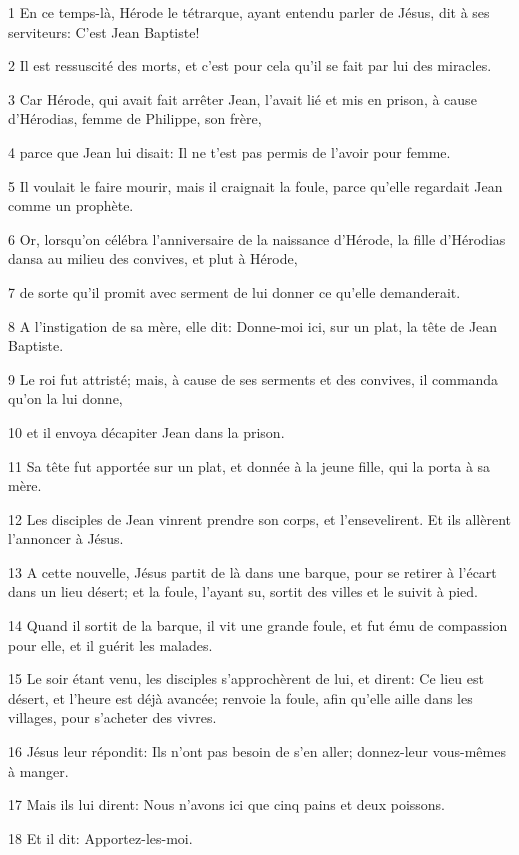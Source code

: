 \par 1 En ce temps-là, Hérode le tétrarque, ayant entendu parler de Jésus, dit à ses serviteurs: C'est Jean Baptiste!
\par 2 Il est ressuscité des morts, et c'est pour cela qu'il se fait par lui des miracles.
\par 3 Car Hérode, qui avait fait arrêter Jean, l'avait lié et mis en prison, à cause d'Hérodias, femme de Philippe, son frère,
\par 4 parce que Jean lui disait: Il ne t'est pas permis de l'avoir pour femme.
\par 5 Il voulait le faire mourir, mais il craignait la foule, parce qu'elle regardait Jean comme un prophète.
\par 6 Or, lorsqu'on célébra l'anniversaire de la naissance d'Hérode, la fille d'Hérodias dansa au milieu des convives, et plut à Hérode,
\par 7 de sorte qu'il promit avec serment de lui donner ce qu'elle demanderait.
\par 8 A l'instigation de sa mère, elle dit: Donne-moi ici, sur un plat, la tête de Jean Baptiste.
\par 9 Le roi fut attristé; mais, à cause de ses serments et des convives, il commanda qu'on la lui donne,
\par 10 et il envoya décapiter Jean dans la prison.
\par 11 Sa tête fut apportée sur un plat, et donnée à la jeune fille, qui la porta à sa mère.
\par 12 Les disciples de Jean vinrent prendre son corps, et l'ensevelirent. Et ils allèrent l'annoncer à Jésus.
\par 13 A cette nouvelle, Jésus partit de là dans une barque, pour se retirer à l'écart dans un lieu désert; et la foule, l'ayant su, sortit des villes et le suivit à pied.
\par 14 Quand il sortit de la barque, il vit une grande foule, et fut ému de compassion pour elle, et il guérit les malades.
\par 15 Le soir étant venu, les disciples s'approchèrent de lui, et dirent: Ce lieu est désert, et l'heure est déjà avancée; renvoie la foule, afin qu'elle aille dans les villages, pour s'acheter des vivres.
\par 16 Jésus leur répondit: Ils n'ont pas besoin de s'en aller; donnez-leur vous-mêmes à manger.
\par 17 Mais ils lui dirent: Nous n'avons ici que cinq pains et deux poissons.
\par 18 Et il dit: Apportez-les-moi.
